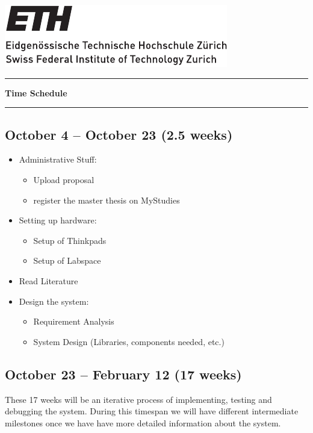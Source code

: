 \documentclass[a4paper, 11pt]{article}
\begin{document}
\includegraphics[scale=1]{../images/ETHlogo_13.pdf}
\vspace{10pt}
\hrule
\vspace{10pt}

\begin{center}
    {\LARGE
    \textbf{\Huge{Time Schedule}}}
\end{center}

\vspace{10pt}
\hrule

\subsection*{October 4 -- October 23 (2.5 weeks)}
\begin{itemize}
    \item Administrative Stuff: 
    \begin{itemize}
        \item Upload proposal
        \item register the master thesis on MyStudies
    \end{itemize}

    \item Setting up hardware: 
    \begin{itemize}
        \item Setup of Thinkpads
        \item Setup of Labspace
    \end{itemize}
 
    \item Read Literature
    
    \item Design the system: 
    \begin{itemize}
        \item Requirement Analysis
        \item System Design (Libraries, components needed, etc.)
    \end{itemize}
\end{itemize}

\subsection*{October 23 -- February 12 (17 weeks)}
These 17 weeks will be an iterative process of implementing, testing and debugging the system. During this timespan we will have different intermediate milestones once we have have more detailed information about the system.
\end{document}
